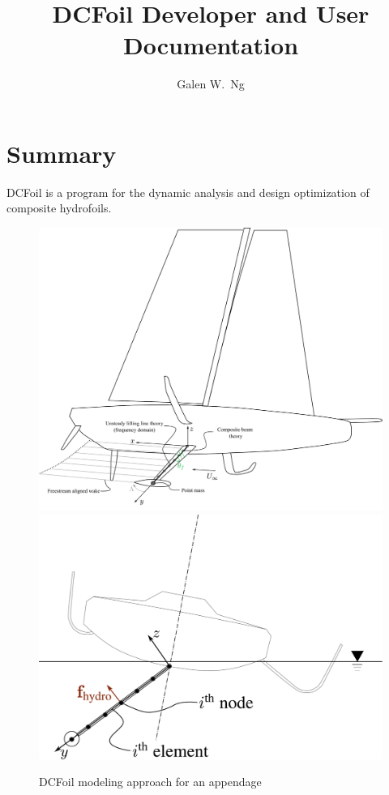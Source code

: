 \documentclass[10pt]{article}
\begin{document}
\title{\vspace{-1.5cm} DCFoil Developer and User Documentation}
\author{Galen W.~Ng}
\maketitle
\section*{Summary}
% 
DCFoil is a program for the dynamic analysis and design optimization of composite hydrofoils.
\begin{figure}[htbp!]
    \centering
    \includegraphics[width=1.0\linewidth,clip,trim={0cm 0cm 0cm 10cm}]{keel-dcfoil.pdf}
    \includegraphics[width=0.5\linewidth,clip,trim={0cm 0cm 0cm 0cm}]{dcfoilkeelfrontview.pdf}
    \caption{\label{fig:keel-dcfoil}
        DCFoil modeling approach for an appendage
    }
\end{figure}
\end{document}
